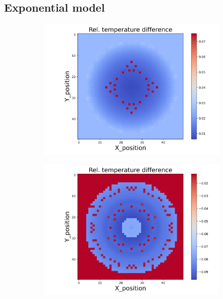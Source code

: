 \subsection{Exponential model}
\begin{figure}[h]
    \centering
    \begin{minipage}{\textwidth}
        \centering
        \begin{subfigure}{0.325\textwidth}
            \centering
            \includegraphics[width=\textwidth]{figures/raw_data/0/exp/T_bias.jpg}
        \end{subfigure}
        \begin{subfigure}{0.325\textwidth}
            \centering
            \includegraphics[width=\textwidth]{figures/raw_data/5/exp/T_bias.jpg}

\end{subfigure}
\end{minipage}
\end{figure}
